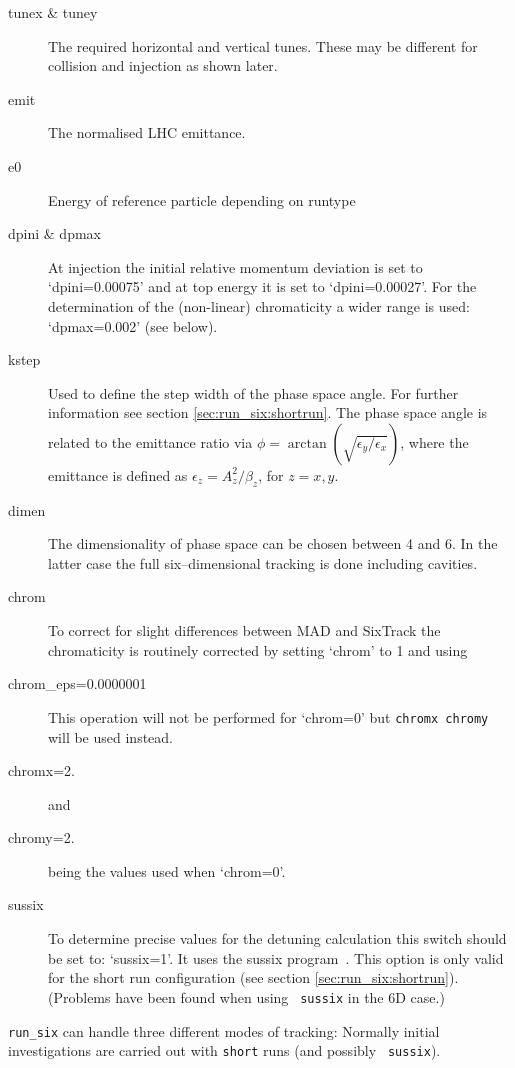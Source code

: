 \documentclass{cernatsnote}
\begin{document}
\begin{description}
\item [tunex \& tuney] The required horizontal and vertical tunes.
These may be different for collision and injection as shown later.
\item [emit] The normalised LHC emittance.
\item [e0] Energy of reference particle depending on runtype
\item [dpini \& dpmax]
  At injection the initial relative momentum deviation is set to
  `dpini=0.00075' and at top energy it is set to `dpini=0.00027'.
  For the determination of the (non-linear) chromaticity a wider range is used:
  `dpmax=0.002' (see below).
\item [kstep]
  Used to define the step width of the phase space angle. For further
  information see section \ref{sec:run_six:shortrun}. The phase space angle is
  related to the emittance ratio via
  $\phi=\arctan\left(\sqrt{{\epsilon_y}/{\epsilon_x}}\right)$, where the
  emittance is defined as $\epsilon_z=A_z^2/\beta_z$, for $z=x,y$.
\item [dimen]
  The dimensionality of phase space can be chosen between 4 and 6. In the
  latter case the full six--dimensional tracking is done including cavities.
\item [chrom]
  To correct for slight differences between MAD and SixTrack the chromaticity
  is routinely corrected by setting `chrom' to 1 and using
\item[chrom\_eps=0.0000001] This operation will not be performed for `chrom=0'
  but {\tt chromx chromy} will be used instead.
\item[chromx=2.] and
\item[chromy=2.] being the values used when `chrom=0'.
\item [sussix]
  To determine precise values for the detuning calculation this switch should
  be set to: `sussix=1'. It uses the sussix program~\cite{lines3}. This option
  is only valid for the short run configuration (see section
  \ref{sec:run_six:shortrun}).  (Problems have been found when using {\tt
  sussix} in the 6D case.)
\end{description}

{\tt run\_six} can handle three different modes of tracking: Normally initial
investigations are carried out with {\tt short} runs (and possibly {\tt
sussix}).
\end{document}
